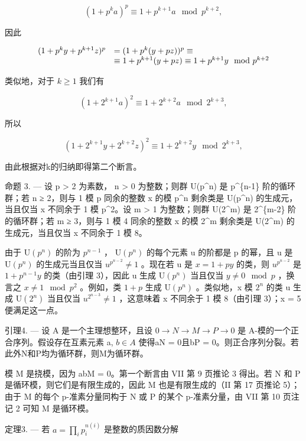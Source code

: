 \[
(1 + p ^ {k} a) ^ {p} \equiv 1 + p ^ {k + 1} a \mod p ^ {k + 2},
\]

因此

\[
\begin{array}{r l} (1 + p ^ {k} y + p ^ {k + 1} z) ^ {p} & = (1 + p ^ {k} (y + p z)) ^ {p} \equiv \\ & \equiv 1 + p ^ {k + 1} (y + p z) \equiv 1 + p ^ {k + 1} y \mod p ^ {k + 2} \end{array}
\]

类似地，对于 \(k \geqslant 1\) 我们有

\[
(1 + 2 ^ {k + 1} a) ^ {2} \equiv 1 + 2 ^ {k + 2} a \mod 2 ^ {k + 3},
\]

所以

\[
(1 + 2 ^ {k + 1} y + 2 ^ {k + 2} z) ^ {2} \equiv 1 + 2 ^ {k + 2} y \mod 2 ^ {k + 3},
\]

由此根据对k的归纳即得第二个断言。

命题 3. --- 设 p \textgreater{} 2 为素数， n \textgreater{} 0 为整数；则群 U(p\^{}n) 是 p\^{}\{n-1\} 阶的循环群；若 n ≥ 2，则与 1 模 p 同余的整数 x 的模 p\^{}n 剩余类是 U(p\^{}n) 的生成元，当且仅当 x 不同余于 1 模 p\^{}2。设 m \textgreater{} 1 为整数；则群 U(2\^{}m) 是 2\^{}\{m-2\} 阶的循环群；若 m ≥ 3，则与 1 模 4 同余的整数 x 的模 2\^{}m 剩余类是 U(2\^{}m) 的生成元，当且仅当 x 不同余于 1 模 8。

由于 \(\mathrm{U}(p^{n})\) 的阶为 \(p^{n-1}\) ， \(\mathrm{U}(p^{n})\) 的每个元素 u 的阶都是 p 的幂，且 u 是 \(\mathrm{U}(p^{n})\) 的生成元当且仅当 \(u^{p^{n-2}} \neq 1\) 。现在若 u 是 \(x = 1 + py\) 的类，则 \(u^{p^{n-2}}\) 是 \(1 + p^{n-1}y\) 的类（由引理 3），因此 u 生成 \(\mathrm{U}(p^{n})\) 当且仅当 \(y \neq 0 \mod p\) ，换言之 \(x \neq 1 \mod p^{2}\) 。例如，类 \(1 + p\) 生成 \(\mathrm{U}(p^{n})\) 。类似地，x 模 \(2^{n}\) 的类 u 生成 \(\mathrm{U}(2^{n})\) 当且仅当 \(u^{2^{n-3}} \neq 1\) ，这意味着 x 不同余于 1 模 8（由引理 3）；x = 5 便满足这一点。

引理4. --- 设 A 是一个主理想整环，且设 \(0 \rightarrow N \rightarrow M \rightarrow P \rightarrow 0\) 是 A-模的一个正合序列。假设存在互素元素 a, \(b \in A\) 使得aN = 0且bP = 0。则正合序列分裂。若此外N和P均为循环群，则M为循环群。

模 M 是挠模，因为 abM = 0。第一个断言由 VII 第 9 页推论 3 得出。若 N 和 P 是循环模，则它们是有限生成的，因此 M 也是有限生成的（II 第 17 页推论 5）；由于 M 的每个 p-准素分量同构于 N 或 P 的某个 p-准素分量，由 VII 第 10 页注记 2 可知 M 是循环模。

定理3. --- 若 \(a = \prod_{i} p_{i}^{n(i)}\) 是整数的质因数分解

